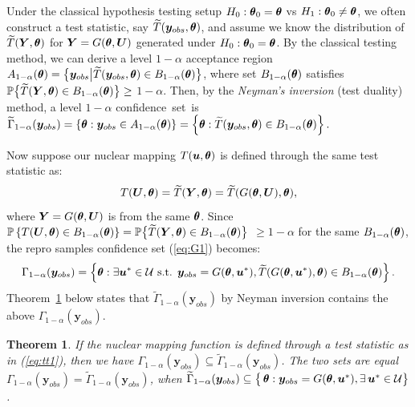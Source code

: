 \documentclass[12pt]{article}
\theoremstyle{shortspace}
\newtheorem{theorem}{Theorem}
\def\*#1{\bm{#1}}
\def\btheta{\mathop{\theta\kern-.45em\hbox{$\theta$}}\nolimits}
\def\P{\mathbb P}
\begin{document}
Under the classical hypothesis testing setup $H_0: \btheta_0 = \btheta$ vs $H_1: \btheta_0 \not = \btheta$, we often construct a test statistic, say $\widetilde T(\*y_{obs}, \btheta)$, and assume we know the distribution of $\widetilde T(\*Y, \btheta)$ for $\*Y = G(\btheta,\*U)$ generated under $H_0: \btheta_0 = \btheta$. 
By the classical testing method, we can derive 
a level $1 - \alpha$ acceptance region $A_{1-\alpha}(\btheta) = \big\{\*y_{obs} \big| \widetilde T(\*y_{obs}, \btheta) \in B_{1 -\alpha}(\btheta)\big\}$, where set $B_{1 -\alpha}(\btheta)$ satisfies~$\P\big\{\widetilde T(\*Y, \btheta) \in   
B_{1 -\alpha}(\btheta)\big\} \ge $ $ 1 - \alpha$. Then, by the {\it Neyman's inversion} (test duality) method,  
a level $1 - \alpha$ confidence~set~is $\widetilde \Gamma_{1-\alpha}(\*y_{obs}) =  \left\{\btheta:  \*y_{obs} \in  A_{1-\alpha}(\btheta) \right\}
= \left\{\btheta:  \widetilde T(\*y_{obs}, \btheta)  \in B_{1 - \alpha}(\btheta) \right\}. $


Now suppose our nuclear mapping $T(\*u, \btheta)$
is defined through
the same test statistic as:
\begin{equation} \label{eq:tt1}
T(\*U, \btheta) = \widetilde T(\*Y, \btheta) = \widetilde T(G({\btheta}, \*U), \btheta), 
\end{equation} 
where $\*Y = G(\btheta,\*U)$ is from 
the same $\btheta$. Since $\P\left\{T(\*U, \btheta) \in  B_{1 -\alpha}(\btheta)\right\} = \P\big\{\widetilde T(\*Y, \btheta) \in  B_{1 -\alpha}(\btheta)\big\}$ 
$\ge 1 - \alpha$ for the same $B_{1 -\alpha}(\btheta)$, the repro samples confidence set (\ref{eq:G1}) becomes:
\begin{eqnarray*}
\Gamma_{1-\alpha}(\*y_{obs}) 
 =  \left\{\btheta: \exists \*u^* \in {\mathcal U} \mbox{ s.t. }  \*y_{obs} = G({\btheta}, \*u^*), \widetilde T(G({\btheta}, \*u^*), \btheta)  \in B_{1 - \alpha}(\btheta)  \right\}.
\end{eqnarray*}
Theorem~\ref{thm:NP} below states that 
$\widetilde \Gamma_{1-\alpha}(\*y_{obs})$ by  Neyman inversion contains the above
$\Gamma_{1-\alpha}(\*y_{obs})$. 
 \begin{theorem}\label{thm:NP}
 If the nuclear mapping function is defined through a test statistic as in (\ref{eq:tt1}), then we have $\Gamma_{1-\alpha}(\*y_{obs}) \subseteq  \widetilde \Gamma_{1-\alpha}(\*y_{obs})$. The two sets are equal  
$\Gamma_{1-\alpha}(\*y_{obs}) = \widetilde \Gamma_{1-\alpha}(\*y_{obs})$, when $\widetilde \Gamma_{1-\alpha}(\*y_{obs}) \subseteq \big\{\btheta:  \*y_{obs} = G({\btheta}, \*u^*), 
\exists \, \*u^* \in {\mathcal U} \big\}$.
 \end{theorem}
 
\end{document}
